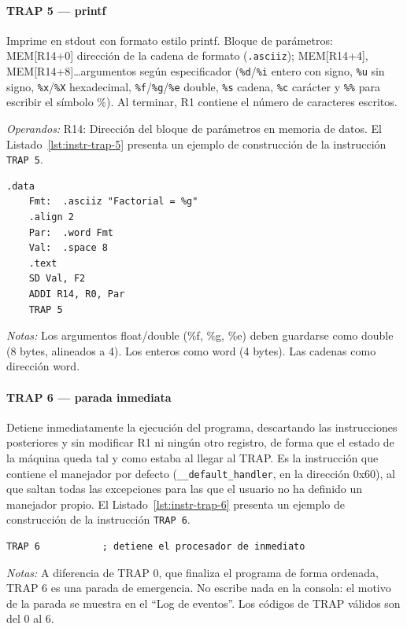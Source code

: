 \documentclass[../main.tex]{subfiles}
\begin{document}
\paragraph*{TRAP 5 --- printf}
Imprime en stdout con formato estilo printf. Bloque de parámetros: MEM[R14+0] dirección de la cadena de formato (\texttt{.asciiz}); MEM[R14+4], MEM[R14+8]\ldots argumentos según especificador (\texttt{\%d}/\texttt{\%i} entero con signo, \texttt{\%u} sin signo, \texttt{\%x}/\texttt{\%X} hexadecimal, \texttt{\%f}/\texttt{\%g}/\texttt{\%e} double, \texttt{\%s} cadena, \texttt{\%c} carácter y \texttt{\%\%} para escribir el símbolo \%). Al terminar, R1 contiene el número de caracteres escritos.

\textit{Operandos:} R14: Dirección del bloque de parámetros en memoria de datos.
El Listado~\ref{lst:instr-trap-5} presenta un ejemplo de construcción de la instrucción \texttt{TRAP 5}.

\begin{lstlisting}[caption={TRAP 5},label={lst:instr-trap-5}]
	.data
	Fmt:  .asciiz "Factorial = %g"
	.align 2
	Par:  .word Fmt
	Val:  .space 8
	.text
	SD Val, F2
	ADDI R14, R0, Par
	TRAP 5
\end{lstlisting}
\textit{Notas:} Los argumentos float/double (\%f, \%g, \%e) deben guardarse como double (8 bytes, alineados a 4). Los enteros como word (4 bytes). Las cadenas como dirección word.

\paragraph*{TRAP 6 --- parada inmediata}
Detiene inmediatamente la ejecución del programa, descartando las instrucciones posteriores y sin modificar R1 ni ningún otro registro, de forma que el estado de la máquina queda tal y como estaba al llegar al TRAP. Es la instrucción que contiene el manejador por defecto (\texttt{\_\_default\_handler}, en la dirección 0x60), al que saltan todas las excepciones para las que el usuario no ha definido un manejador propio.
El Listado~\ref{lst:instr-trap-6} presenta un ejemplo de construcción de la instrucción \texttt{TRAP 6}.

\begin{lstlisting}[caption={TRAP 6},label={lst:instr-trap-6}]
	TRAP 6           ; detiene el procesador de inmediato
\end{lstlisting}
\textit{Notas:} A diferencia de TRAP 0, que finaliza el programa de forma ordenada, TRAP 6 es una parada de emergencia. No escribe nada en la consola: el motivo de la parada se muestra en el ``Log de eventos''. Los códigos de TRAP válidos son del 0 al 6.
\end{document}
